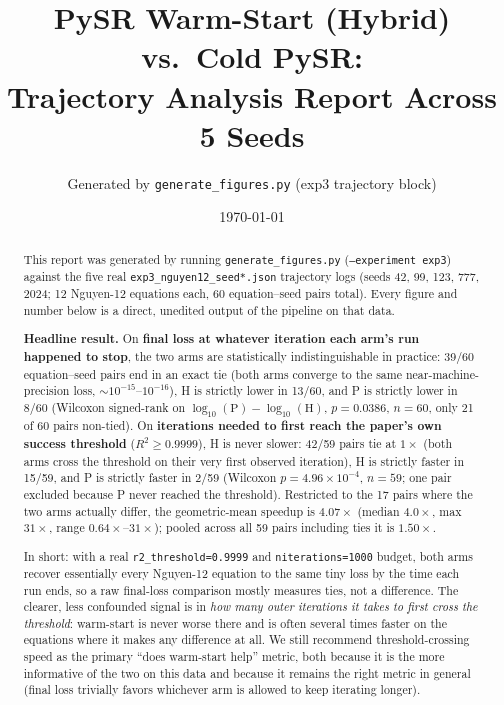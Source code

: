 \documentclass[11pt]{article}
\title{PySR Warm-Start (Hybrid) vs.\ Cold PySR:\\
Trajectory Analysis Report Across 5 Seeds}
\author{Generated by \texttt{generate\_figures.py} (exp3 trajectory block)}
\date{\today}
\newcommand{\Rsq}{R^2}
\begin{document}
\maketitle

\begin{abstract}
\noindent This report was generated by running \texttt{generate\_figures.py} (\texttt{--experiment
exp3}) against the five real \texttt{exp3\_nguyen12\_seed*.json} trajectory logs (seeds 42, 99,
123, 777, 2024; 12 Nguyen-12 equations each, 60 equation--seed pairs total). Every figure and
number below is a direct, unedited output of the pipeline on that data.

\smallskip
\noindent \textbf{Headline result.} On \textbf{final loss at whatever iteration each arm's run
happened to stop}, the two arms are statistically indistinguishable in practice: 39/60
equation--seed pairs end in an exact tie (both arms converge to the same near-machine-precision
loss, $\sim\!10^{-15}$--$10^{-16}$), H is strictly lower in 13/60, and P is strictly lower in 8/60
(Wilcoxon signed-rank on $\log_{10}(\text{P})-\log_{10}(\text{H})$, $p=0.0386$, $n=60$, only 21 of
60 pairs non-tied). On \textbf{iterations needed to first reach the paper's own success threshold}
($\Rsq \ge 0.9999$), H is never slower: 42/59 pairs tie at $1\times$ (both arms cross the threshold
on their very first observed iteration), H is strictly faster in 15/59, and P is strictly faster
in 2/59 (Wilcoxon $p=4.96\times10^{-4}$, $n=59$; one pair excluded because P never reached the
threshold). Restricted to the 17 pairs where the two arms actually differ, the geometric-mean
speedup is $4.07\times$ (median $4.0\times$, max $31\times$, range $0.64\times$--$31\times$);
pooled across all 59 pairs including ties it is $1.50\times$.

\smallskip
\noindent In short: with a real \texttt{r2\_threshold=0.9999} and \texttt{niterations=1000} budget,
both arms recover essentially every Nguyen-12 equation to the same tiny loss by the time each run
ends, so a raw final-loss comparison mostly measures ties, not a difference. The clearer, less
confounded signal is in \emph{how many outer iterations it takes to first cross the threshold}:
warm-start is never worse there and is often several times faster on the equations where it makes
any difference at all. We still recommend threshold-crossing speed as the primary ``does
warm-start help'' metric, both because it is the more informative of the two on this data and
because it remains the right metric in general (final loss trivially favors whichever arm is
allowed to keep iterating longer).


\end{abstract}
\end{document}
